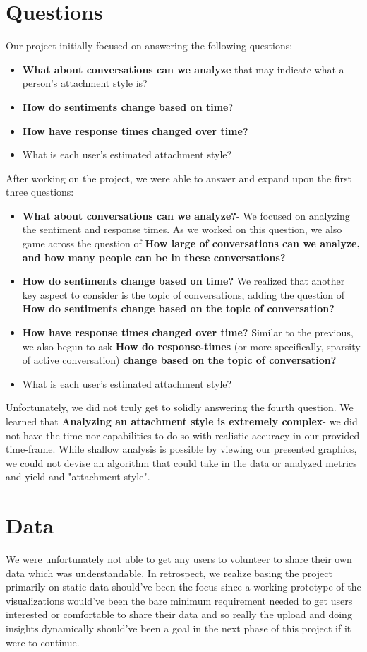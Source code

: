 \documentclass{article}\usepackage{graphicx}
\begin{document}
\section{Questions}
Our project initially focused on answering the following questions:
\begin{itemize}
  \item \textbf{What about conversations can we analyze} that may indicate what a person's attachment style is? 
  \item \textbf{How do sentiments change based on time}? 
  \item \textbf{How have response times changed over time?} 
  \item What is each user's estimated attachment style? 
\end{itemize}
After working on the project, we were able to answer and expand upon the first three questions:
\begin{itemize}
  \item \textbf{What about conversations can we analyze?}- We focused on analyzing the sentiment and response times. As we worked on this question, we also game across the question of \textbf{How large of conversations can we analyze, and how many people can be in these conversations?}
  \item \textbf{How do sentiments change based on time?} We realized that another key aspect to consider is the topic of conversations, adding the question of \textbf{How do sentiments change based on the topic of conversation?} 
  \item \textbf{How have response times changed over time?} Similar to the previous, we also begun to ask \textbf{How do response-times} (or more specifically, sparsity of active conversation) \textbf{change based on the topic of conversation?} 
  \item What is each user's estimated attachment style? 
\end{itemize}
Unfortunately, we did not truly get to solidly answering the fourth question. We learned that \textbf{Analyzing an attachment style is extremely complex}- we did not have the time nor capabilities to do so with realistic accuracy in our provided time-frame. While shallow analysis is possible by viewing our presented graphics, we could not devise an algorithm that could take in the data or analyzed metrics and yield and "attachment style".


\section{Data}
We were unfortunately not able to get any users to volunteer to share their own data which was understandable. In retrospect, we realize basing the project primarily on static data should've been the focus since a working prototype of the visualizations would've been the bare minimum requirement needed to get users interested or comfortable to share their data and so really the upload and doing insights dynamically should've been a goal in the next phase of this project if it were to continue.
\newline
\end{document}
